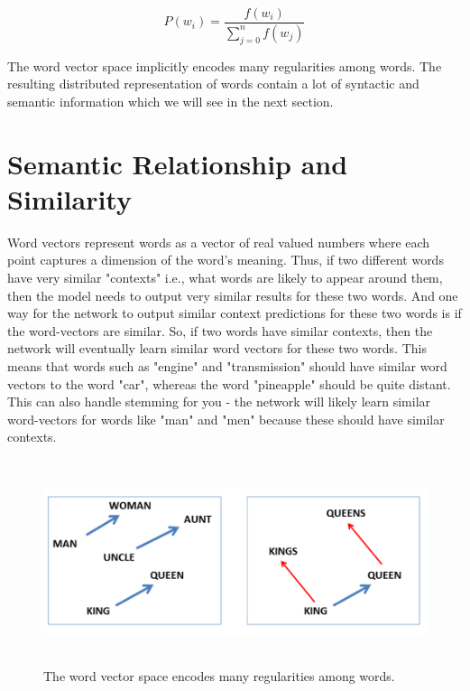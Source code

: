 \begin{equation}
P(w_{i}) = \frac{f(w_{i})}{\sum_{j=0}^{n}f(w_{j})}
\end{equation}

The word vector space implicitly encodes many regularities among words. The resulting distributed representation of words contain a lot of syntactic and semantic information which we will see in the next section.

\section{Semantic Relationship and Similarity}

Word vectors represent words as a vector of real valued numbers where each point captures a dimension of the word's meaning. Thus, if two different words have very similar "contexts" i.e., what words are likely to appear around them, then the model needs to output very similar results for these two words. And one way for the network to output similar context predictions for these two words is if the word-vectors are similar. So, if two words have similar contexts, then the network will eventually learn similar word vectors for these two words. This means that words such as "engine" and "transmission" should have similar word vectors to the word "car", whereas the word "pineapple" should be quite distant. This can also handle stemming for you - the network will likely learn similar word-vectors for words like "man" and "men" because these should have similar contexts.

\newpage

\begin{figure}[htbp]
\centering
\includegraphics[width=12cm, height=6cm]{images/wv-similarities.PNG}
\centering
\caption{The word vector space encodes many regularities among words.}
\label{fig:foo}
\end{figure}

